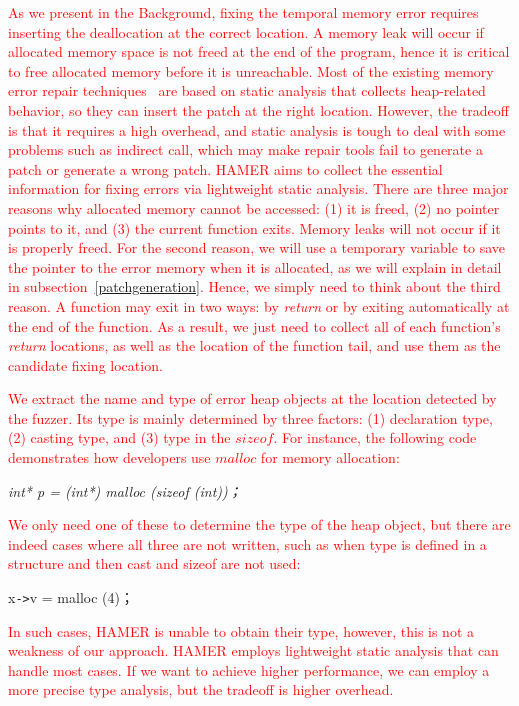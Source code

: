 \documentclass[a4paper,11pt,oneside,openany]{book}
\begin{document}
\textcolor{red}{
As we present in the Background, fixing the temporal memory error requires inserting the deallocation at the correct location. A memory leak will occur if allocated memory space is not freed at the end of the program, hence it is critical to free allocated memory before it is unreachable. Most of the existing memory error repair techniques~\cite{SAVER, Memfix} are based on static analysis that collects heap-related behavior, so they can insert the patch at the right location. However, the tradeoff is that it requires a high overhead, and static analysis is tough to deal with some problems such as indirect call, which may make repair tools fail to generate a patch or generate a wrong patch. HAMER aims to collect the essential information for fixing errors via lightweight static analysis. There are three major reasons why allocated memory cannot be accessed: (1) it is freed, (2) no pointer points to it, and (3) the current function exits. Memory leaks will not occur if it is properly freed. For the second reason, we will use a temporary variable to save the pointer to the error memory when it is allocated, as we will explain in detail in subsection~\ref{patchgeneration}. Hence,  we simply need to think about the third reason. A function may exit in two ways: by {\it return} or by exiting automatically at the end of the function. As a result, we just need to collect all of each function's {\it return} locations, as well as the location of the function tail, and use them as the candidate fixing location.
}

\textcolor{red}{
We extract the name and type of error heap objects at the location detected by the fuzzer. Its type is mainly determined by three factors: (1) declaration type, (2) casting type, and (3) type in the $sizeof$. For instance, the following code demonstrates how developers use $malloc$ for memory allocation:
}

\begin{minipage}{\textwidth}
\vspace{0.2cm}
\textsl{\hspace{0.3cm}int* p = (int*) malloc (sizeof (int))；}
\vspace{0.2cm}
\end{minipage}
\textcolor{red}{
We only need one of these to determine the type of the heap object, but there are indeed cases where all three are not written, such as when type is defined in a structure and then cast and sizeof are not used:
}

\begin{minipage}{\textwidth}
\vspace{0.2cm}
\hspace{0.3cm}x\verb|->|v = malloc (4)；
\vspace{0.2cm}
\end{minipage}
\textcolor{red}{
In such cases, HAMER is unable to obtain their type, however, this is not a weakness of our approach. HAMER employs lightweight static analysis that can handle most cases. If we want to achieve higher performance, we can employ a more precise type analysis, but the tradeoff is higher overhead.
}
\end{document}
